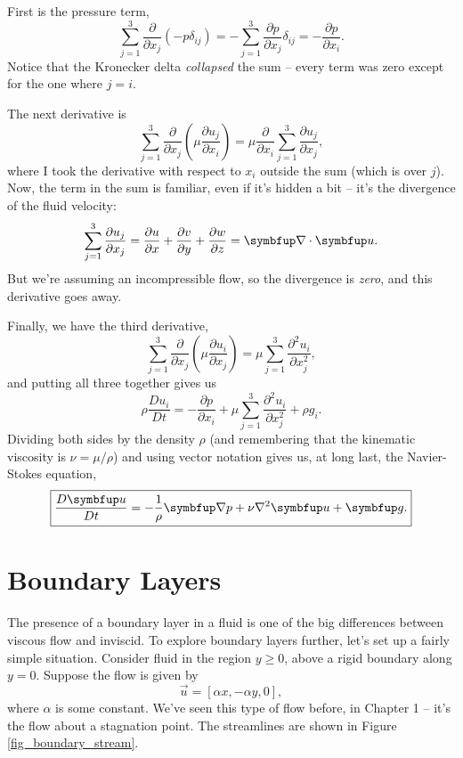 First is the pressure term,
\[
\sum_{j=1}^3 \frac{\partial }{\partial x_j} \left( -p \delta_{ij} \right) = - \sum_{j=1}^3  \frac{\partial p}{\partial x_j} \delta_{ij} = -\frac{\partial p}{\partial x_i}.
\]
Notice that the Kronecker delta \emph{collapsed} the sum -- every term was zero except for the one where $j = i$.  

The next derivative is
\[
\sum_{j=1}^3 \frac{\partial }{\partial x_j} \left( \mu \frac{\partial u_j}{\partial x_i} \right) = \mu \frac{\partial }{\partial x_i} \sum_{j=1}^3 \frac{\partial u_j}{\partial x_j},
\]
where I took the derivative with respect to $x_i$ outside the sum (which is over $j$).  Now, the term in the sum is familiar, even if it's hidden a bit -- it's the divergence of the fluid velocity:
\[
\sum_{j=1}^3 \frac{\partial u_j}{\partial x_j} = \frac{\partial u}{\partial x} + \frac{\partial v}{\partial y} + \frac{\partial w}{\partial z} = \grad \cdot \vec{u}.
\]
But we're assuming an incompressible flow, so the divergence is \emph{zero}, and this derivative goes away.

Finally, we have the third derivative,
\[
\sum_{j=1}^3 \frac{\partial }{\partial x_j} \left( \mu \frac{\partial u_i}{\partial x_j} \right) = \mu \sum_{j=1}^3 \frac{\partial^2 u_i}{\partial x_j^2},
\]
and putting all three together gives us 
\[
\rho \frac{Du_i}{Dt} = -\frac{\partial p}{\partial x_i} + \mu \sum_{j=1}^3 \frac{\partial^2 u_i}{\partial x_j^2} + \rho g_i.
\]
Dividing both sides by the density $\rho$ (and remembering that the kinematic viscosity is $\nu = \mu / \rho$) and using vector notation gives us, at long last, the Navier-Stokes equation,
\begin{equation}
\boxed{
\frac{D \vec{u}}{Dt} = - \frac{1}{\rho} \grad p + \nu \nabla^2 \vec{u} + \vec{g}.
}
\end{equation}


%
% 

\section{Boundary Layers}
\label{sec_boundary_layers}

The presence of a boundary layer in a fluid is one of the big differences between viscous flow and inviscid.  To explore boundary layers further, let's set up a fairly simple situation.  Consider fluid in the region $y \ge 0$, above a rigid boundary along $y=0$.  Suppose the flow is given by
\begin{equation}
\vec{u} = [\alpha x, -\alpha y, 0],
\end{equation}
where $\alpha$ is some constant.  We've seen this type of flow before, in Chapter 1 -- it's the flow about a stagnation point.  The streamlines are shown in Figure \ref{fig_boundary_stream}.

